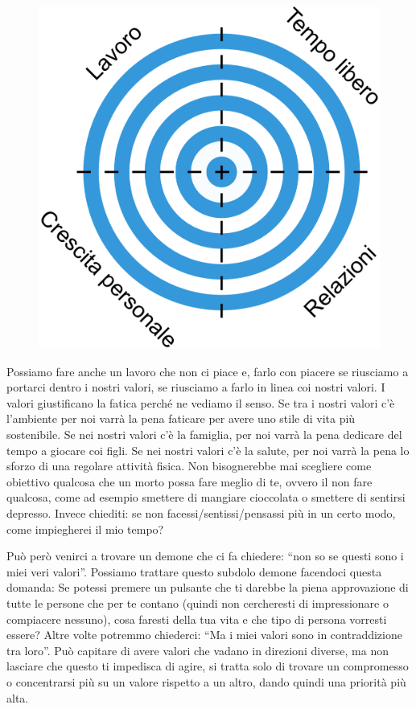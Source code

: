 \documentclass[12pt]{book} %
\begin{document}
\begin{figure}
  \centering
  \includegraphics[width=0.95\linewidth]{images/Libro-img014.png}
\end{figure}

Possiamo fare anche un lavoro che non ci piace e, farlo con piacere se riusciamo a portarci dentro i nostri valori, se
riusciamo a farlo in linea coi nostri valori. I valori giustificano la fatica perché ne vediamo il senso. Se tra i
nostri valori c'è l'ambiente per noi varrà la pena faticare per avere uno
stile di vita più sostenibile. Se nei nostri valori c'è la famiglia, per noi varrà la pena
dedicare del tempo a giocare coi figli. Se nei nostri valori c'è la salute, per noi varrà la pena
lo sforzo di una regolare attività fisica. Non bisognerebbe mai scegliere come obiettivo qualcosa che un morto possa
fare meglio di te, ovvero il non fare qualcosa, come ad esempio smettere di mangiare cioccolata o smettere di sentirsi
depresso. Invece chiediti: se non facessi/sentissi/pensassi più in un certo modo, come impiegherei il mio tempo?

Può però venirci a trovare un demone che ci fa chiedere: “non so se questi sono i miei veri valori”. Possiamo trattare
questo subdolo demone facendoci questa domanda: Se potessi premere un pulsante che ti darebbe la piena approvazione di
tutte le persone che per te contano (quindi non cercheresti di impressionare o compiacere nessuno), cosa faresti della
tua vita e che tipo di persona vorresti essere? Altre volte potremmo chiederci: “Ma i miei valori sono in
contraddizione tra loro”. Può capitare di avere valori che vadano in direzioni diverse, ma non lasciare che questo ti
impedisca di agire, si tratta solo di trovare un compromesso o concentrarsi più su un valore rispetto a un altro, dando
quindi una priorità più alta.
\end{document}

